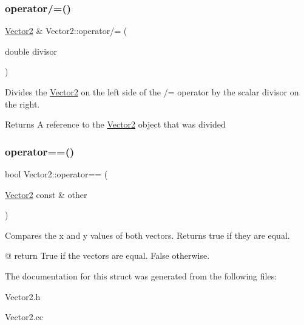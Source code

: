 \subsubsection{\texorpdfstring{operator/=()}{operator/=()}}
{\footnotesize\ttfamily \hyperlink{structVector2}{Vector2} \& Vector2\+::operator/= (\begin{DoxyParamCaption}\item[{double}]{divisor }\end{DoxyParamCaption})}

Divides the \hyperlink{structVector2}{Vector2} on the left side of the /= operator by the scalar divisor on the right.

\begin{DoxyReturn}{Returns}
A reference to the \hyperlink{structVector2}{Vector2} object that was divided 
\end{DoxyReturn}
\mbox{\label{structVector2_afcebc6a4ad7b13fe193e84610e276a4d}} 
\subsubsection{\texorpdfstring{operator==()}{operator==()}}
{\footnotesize\ttfamily bool Vector2\+::operator== (\begin{DoxyParamCaption}\item[{\hyperlink{structVector2}{Vector2} const \&}]{other }\end{DoxyParamCaption})}

Compares the x and y values of both vectors. Returns true if they are equal.

@ return True if the vectors are equal. False otherwise. 

The documentation for this struct was generated from the following files\+:\begin{DoxyCompactItemize}
\item 
Vector2.\+h\item 
Vector2.\+cc\end{DoxyCompactItemize}
